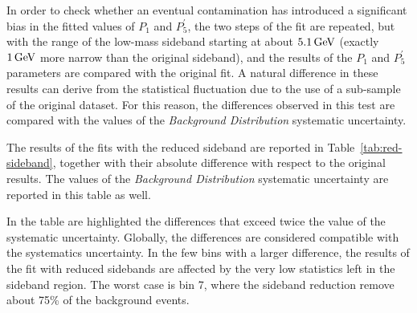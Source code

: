 In order to check whether an eventual contamination has introduced a significant bias in the fitted values of $P_1$ and $P^\prime_5$, the two steps of the fit are repeated, but with the range of the low-mass sideband starting at about $5.1 \,\textrm{GeV}$ (exactly $1 \,\textrm{GeV}$ more narrow than the original sideband), and the results of the $P_1$ and $P^\prime_5$ parameters are compared with the original fit.
A natural difference in these results can derive from the statistical fluctuation due to the use of a sub-sample of the original dataset.
For this reason, the differences observed in this test are compared with the values of the \textit{Background Distribution} systematic uncertainty.

The results of the fits with the reduced sideband are reported in Table~\ref{tab:red-sideband}, together with their absolute difference with respect to the original results.
The values of the \textit{Background Distribution} systematic uncertainty are reported in this table as well.

In the table are highlighted the differences that exceed twice the value of the systematic uncertainty.
Globally, the differences are considered compatible with the systematics uncertainty.
In the few bins with a larger difference, the results of the fit with reduced sidebands are affected by the very low statistics left in the sideband region.
The worst case is bin 7, where the sideband reduction remove about 75\% of the background events.

